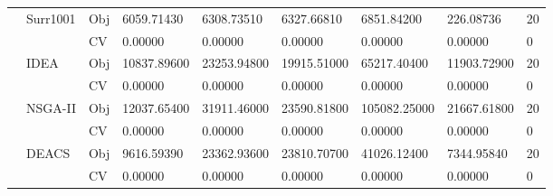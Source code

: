 \begin{table*}[!htb]
\begin{tabular}{lllllllll}
		& Surr1001                           & Obj                                & 6059.71430                         & 6308.73510                         & 6327.66810                           & 6851.84200                          & 226.08736                         & 20               \\
		&                                    & CV                                 & 0.00000                            & 0.00000                            & 0.00000                              & 0.00000                             & 0.00000                           & 0                \\
		& IDEA                               & Obj                                & 10837.89600                        & 23253.94800                        & 19915.51000                          & 65217.40400                         & 11903.72900                       & 20               \\
		&                                    & CV                                 & 0.00000                            & 0.00000                            & 0.00000                              & 0.00000                             & 0.00000                           & 0                \\
		& NSGA-II                            & Obj                                & 12037.65400                        & 31911.46000                        & 23590.81800                          & 105082.25000                        & 21667.61800                       & 20               \\
		&                                    & CV                                 & 0.00000                            & 0.00000                            & 0.00000                              & 0.00000                             & 0.00000                           & 0                \\
		& DEACS                              & Obj                                & 9616.59390                         & 23362.93600                        & 23810.70700                          & 41026.12400                         & 7344.95840                        & 20               \\
		&                                    & CV                                 & 0.00000                            & 0.00000                            & 0.00000                              & 0.00000                             & 0.00000                           & 0                \\

\end{tabular}
\end{table*}
